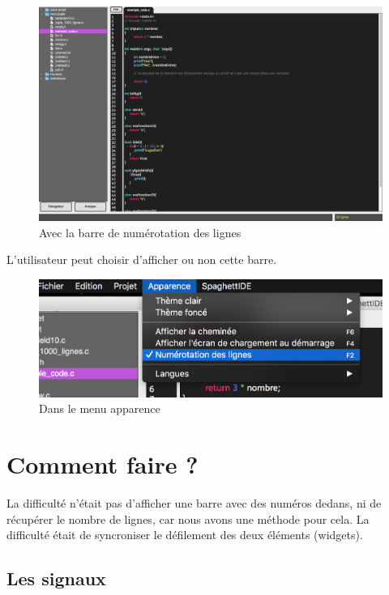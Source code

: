 \documentclass[a4paper,12pt]{article}
\begin{document}
		\begin{figure}[h!]
			\begin{center}
				\includegraphics[scale=0.25]{images/apres}
				\caption{Avec la barre de numérotation des lignes}
			\end{center}
		\end{figure}
		
	L'utilisateur peut choisir d'afficher ou non cette barre.
	
		\begin{figure}[h!]
			\begin{center}
				\includegraphics[scale=0.8]{images/menu}
				\caption{Dans le menu apparence}
			\end{center}
		\end{figure}
		
\section{Comment faire ?}

	La difficulté n'était pas d'afficher une barre avec des numéros dedans, ni de récupérer le nombre de lignes, car nous avons une méthode pour cela. La difficulté était de syncroniser le défilement des deux éléments (widgets).
	
	\subsection{Les signaux}
	
\end{document}
